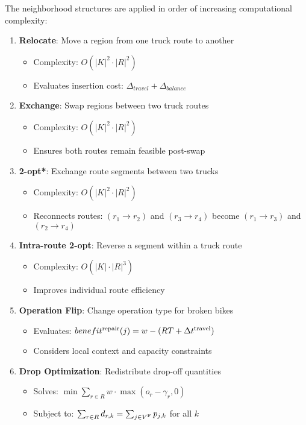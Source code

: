 The neighborhood structures are applied in order of increasing computational complexity:

\begin{enumerate}
    \item \textbf{Relocate}: Move a region from one truck route to another
          \begin{itemize}
              \item Complexity: $O(|K|^2 \cdot |R|^2)$
              \item Evaluates insertion cost: $\Delta_{travel} + \Delta_{balance}$
          \end{itemize}

    \item \textbf{Exchange}: Swap regions between two truck routes
          \begin{itemize}
              \item Complexity: $O(|K|^2 \cdot |R|^2)$
              \item Ensures both routes remain feasible post-swap
          \end{itemize}

    \item \textbf{2-opt*}: Exchange route segments between two trucks
          \begin{itemize}
              \item Complexity: $O(|K|^2 \cdot |R|^2)$
              \item Reconnects routes: $(r_1 \rightarrow r_2)$ and $(r_3 \rightarrow r_4)$ become $(r_1 \rightarrow r_3)$ and $(r_2 \rightarrow r_4)$
          \end{itemize}

    \item \textbf{Intra-route 2-opt}: Reverse a segment within a truck route
          \begin{itemize}
              \item Complexity: $O(|K| \cdot |R|^3)$
              \item Improves individual route efficiency
          \end{itemize}

    \item \textbf{Operation Flip}: Change operation type for broken bikes
          \begin{itemize}
              \item Evaluates: $benefit^{\text{repair}}(j) = w - (RT + \Delta t^{\text{travel}})$
              \item Considers local context and capacity constraints
          \end{itemize}

    \item \textbf{Drop Optimization}: Redistribute drop-off quantities
          \begin{itemize}
              \item Solves: $\min \sum_{r \in R} w \cdot \max(o_r - \gamma_r, 0)$
              \item Subject to: $\sum_{r \in R} d_{r,k} = \sum_{j \in V^{\text{F}}} p_{j,k}$ for all $k$
          \end{itemize}
\end{enumerate}

